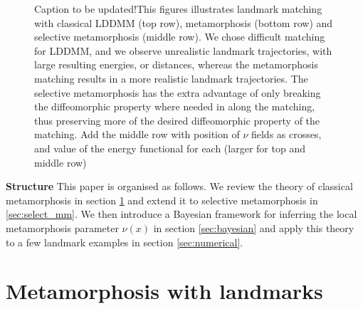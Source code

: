 \documentclass[runningheads]{llncs}
\begin{document}
\begin{figure}
\begin{minipage}{\textwidth}
    \caption{{\color{red} Caption to be updated!}This figures illustrates landmark matching with classical LDDMM
    (top row), metamorphosis (bottom row) and selective metamorphosis (middle
    row).  We chose difficult matching for LDDMM, and we observe unrealistic
    landmark trajectories, with large resulting energies, or distances, whereas
    the metamorphosis  matching results in a more realistic landmark
    trajectories.  The selective metamorphosis has the extra advantage of only
    breaking the diffeomorphic property where needed in along the matching, thus
    preserving more of the desired diffeomorphic property of the matching.
    {\color{red} Add the middle row with position of $\nu$ fields as crosses,
    and value of the energy functional for each (larger for top and middle
    row)}}
    \label{fig:mm_lddmm}
\end{minipage}
\end{figure}


{\bf Structure} This paper is organised as follows. We review the theory of
classical metamorphosis in section \ref{sec:bg} and extend it to selective
metamorphosis in \ref{sec:select_mm}.  We then introduce a Bayesian framework
for inferring the local metamorphosis parameter $\nu(x)$ in section
\ref{sec:bayesian} and apply this theory to a few landmark examples in section
\ref{sec:numerical}.

\section{Metamorphosis with landmarks}\label{sec:bg}
\end{document}
